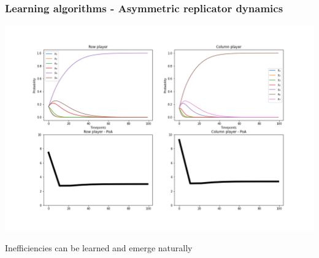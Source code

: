 
    





\begin{frame}
    \frametitle{Learning algorithms - Asymmetric replicator dynamics}

    \includegraphics[scale=0.28]{Bin/replicator_dynamics/ARD_game.png}
\end{frame}

\begin{frame}
    \centering
    \Huge{
    Inefficiencies can be learned and emerge naturally
    }
\end{frame}


